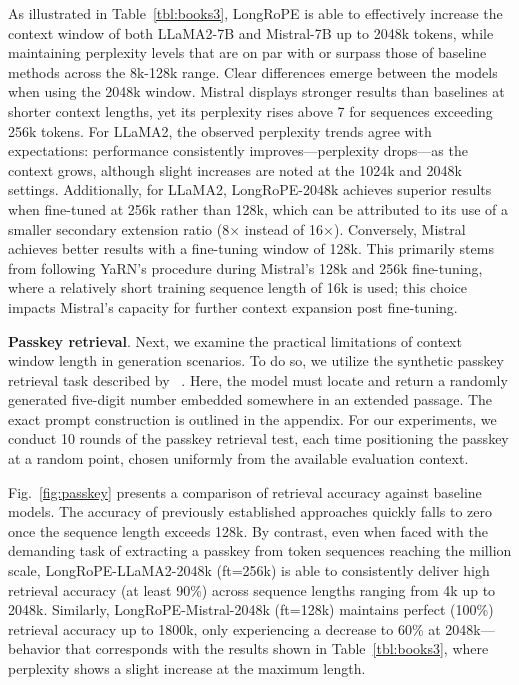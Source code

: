 As illustrated in Table~\ref{tbl:books3}, LongRoPE is able to effectively increase the context window of both LLaMA2-7B and Mistral-7B up to 2048k tokens, while maintaining perplexity levels that are on par with or surpass those of baseline methods across the 8k-128k range. Clear differences emerge between the models when using the 2048k window. Mistral displays stronger results than baselines at shorter context lengths, yet its perplexity rises above 7 for sequences exceeding 256k tokens. For LLaMA2, the observed perplexity trends agree with expectations: performance consistently improves—perplexity drops—as the context grows, although slight increases are noted at the 1024k and 2048k settings. Additionally, for LLaMA2, LongRoPE-2048k achieves superior results when fine-tuned at 256k rather than 128k, which can be attributed to its use of a smaller secondary extension ratio (8$\times$ instead of 16$\times$). Conversely, Mistral achieves better results with a fine-tuning window of 128k. This primarily stems from following YaRN's procedure during Mistral's 128k and 256k fine-tuning, where a relatively short training sequence length of 16k is used; this choice impacts Mistral's capacity for further context expansion post fine-tuning.

\textbf{Passkey retrieval}. Next, we examine the practical limitations of context window length in generation scenarios. To do so, we utilize the synthetic passkey retrieval task described by ~\cite{passkey}. Here, the model must locate and return a randomly generated five-digit number embedded somewhere in an extended passage. The exact prompt construction is outlined in the appendix. For our experiments, we conduct 10 rounds of the passkey retrieval test, each time positioning the passkey at a random point, chosen uniformly from the available evaluation context.

Fig.~\ref{fig:passkey} presents a comparison of retrieval accuracy against baseline models. The accuracy of previously established approaches quickly falls to zero once the sequence length exceeds 128k. By contrast, even when faced with the demanding task of extracting a passkey from token sequences reaching the million scale, LongRoPE-LLaMA2-2048k (ft=256k) is able to consistently deliver high retrieval accuracy (at least 90\%) across sequence lengths ranging from 4k up to 2048k. Similarly, LongRoPE-Mistral-2048k (ft=128k) maintains perfect (100\%) retrieval accuracy up to 1800k, only experiencing a decrease to 60\% at 2048k—behavior that corresponds with the results shown in Table~\ref{tbl:books3}, where perplexity shows a slight increase at the maximum length.

